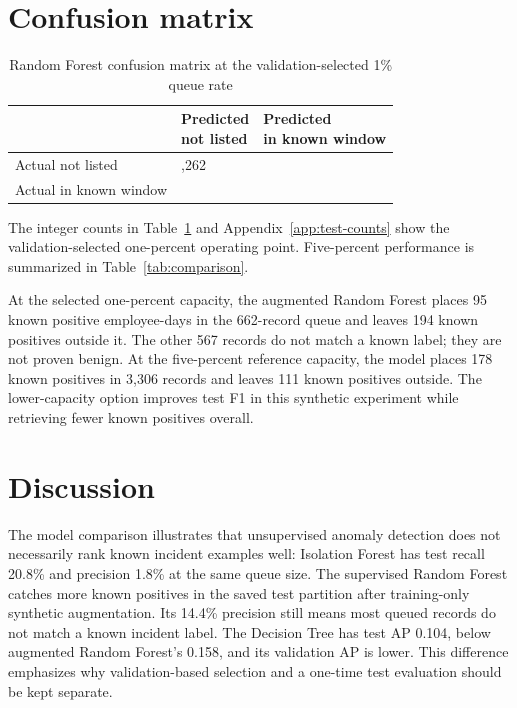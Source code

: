 \documentclass[12pt,a4paper,oneside]{report}
\begin{document}
\section{Confusion matrix}
\begin{table}[!htbp]
\centering
\caption{Random Forest confusion matrix at the validation-selected 1\% queue rate}
\label{tab:matrix}
\begin{tabularx}{\textwidth}{|p{}|*{2}{>{\centering\arraybackslash}X|}}
\hline
 & \shortstack{Predicted\\not listed} & \shortstack{Predicted\\in known window}\\
\hline
Actual not listed & 65,262 & 567\\
\hline
Actual in known window & 194 & 95\\
\hline
\end{tabularx}
\end{table}

The integer counts in Table~\ref{tab:matrix} and
Appendix~\ref{app:test-counts} show the validation-selected one-percent
operating point. Five-percent performance is summarized in
Table~\ref{tab:comparison}.

At the selected one-percent capacity, the augmented Random Forest places 95 known
positive employee-days in the 662-record queue and leaves 194 known
positives outside it. The other 567 records do not match a known label;
they are not proven benign. At the five-percent reference capacity, the
model places 178 known positives in 3,306 records and leaves 111 known
positives outside. The lower-capacity option improves test F1 in this
synthetic experiment while retrieving fewer known positives overall.

\section{Discussion}
The model comparison illustrates that unsupervised anomaly detection
does not necessarily rank known incident examples well: Isolation Forest
has test recall 20.8\% and precision 1.8\% at the same queue size. The
supervised Random Forest catches more known positives in the saved test
partition after training-only synthetic augmentation. Its 14.4\%
precision still means most queued records do not match a known incident
label. The Decision Tree has test AP 0.104, below augmented Random
Forest's 0.158, and its validation AP is lower. This difference emphasizes why
validation-based selection and a one-time test evaluation should be
kept separate.
\end{document}

